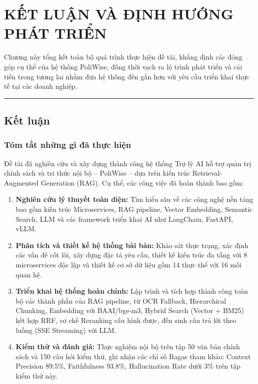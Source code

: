 \documentclass[12pt,a4paper]{report}
\begin{document}
\clearpage

\chapter{KẾT LUẬN VÀ ĐỊNH HƯỚNG PHÁT TRIỂN}

Chương này tổng kết toàn bộ quá trình thực hiện đề tài, khẳng định các đóng góp cụ thể của hệ thống PoliWise, đồng thời vạch ra lộ trình phát triển và cải tiến trong tương lai nhằm đưa hệ thống đến gần hơn với yêu cầu triển khai thực tế tại các doanh nghiệp.

\rule{\textwidth}{0.5pt}

\section{Kết luận}

\subsection{Tóm tắt những gì đã thực hiện}

Đề tài đã nghiên cứu và xây dựng thành công hệ thống Trợ lý AI hỗ trợ quản trị chính sách và tri thức nội bộ -- PoliWise -- dựa trên kiến trúc Retrieval-Augmented Generation (RAG). Cụ thể, các công việc đã hoàn thành bao gồm:

\begin{enumerate}
    \item \textbf{Nghiên cứu lý thuyết toàn diện:} Tìm hiểu sâu về các công nghệ nền tảng bao gồm kiến trúc Microservices, RAG pipeline, Vector Embedding, Semantic Search, LLM và các framework triển khai AI như LangChain, FastAPI, vLLM.

    \item \textbf{Phân tích và thiết kế hệ thống bài bản:} Khảo sát thực trạng, xác định các vấn đề cốt lõi, xây dựng đặc tả yêu cầu, thiết kế kiến trúc đa tầng với 8 microservices độc lập và thiết kế cơ sở dữ liệu gồm 14 thực thể với 16 mối quan hệ.

    \item \textbf{Triển khai hệ thống hoàn chỉnh:} Lập trình và tích hợp thành công toàn bộ các thành phần của RAG pipeline, từ OCR Fallback, Hierarchical Chunking, Embedding với BAAI/bge-m3, Hybrid Search (Vector + BM25) kết hợp RRF, cơ chế Reranking cấu hình được, đến sinh câu trả lời theo luồng (SSE Streaming) với LLM.

    \item \textbf{Kiểm thử và đánh giá:} Thực nghiệm nội bộ trên tập 50 văn bản chính sách và 150 câu hỏi kiểm thử, ghi nhận các chỉ số Ragas tham khảo: Context Precision 89.5\%, Faithfulness 93.8\%, Hallucination Rate dưới 3\% trên tập kiểm thử này.
\end{enumerate}
\end{document}
